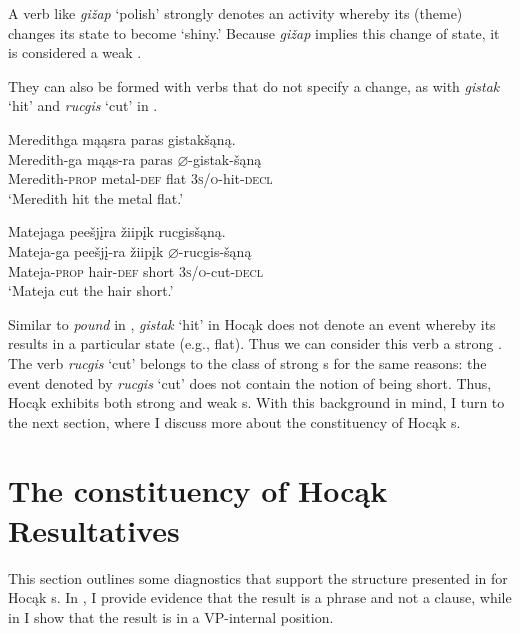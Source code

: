 \documentclass[output=paper]{LSP/langsci}
\begin{document}
A verb like \textit{gižap} `polish' strongly denotes an activity whereby its  (the\-me) changes its state to become `shiny.' Because \textit{gižap} implies this change of state, it is considered a weak . 

They can also be formed with verbs that do not specify a change, as with \textit{gistak} `hit' and \textit{rucgis} `cut' in .

\begin{exe}
\ex\label{ex:rosen:13}
\begin{xlist}

\ex \glll Meredithga mąąsra paras gistakšąną. \\
 Meredith-ga mąąs-ra paras {$\varnothing$}-gistak-šąną\\
Meredith-\textsc{prop} metal-\textsc{def} flat \textsc{3s/o}-hit-\textsc{decl}\\
\glt `Meredith hit the metal flat.'

\ex \glll Matejaga peešjįra žiipįk rucgisšąną.\\
Mateja-ga peešjį-ra žiipįk {$\varnothing$}-rucgis-šąną\\
Mateja-\textsc{prop} hair-\textsc{def} short \textsc{3s/o}-cut-\textsc{decl}\\
\glt `Mateja cut the hair short.'

\end{xlist}
\end{exe}
 
Similar to \textit{pound} in , \textit{gistak} `hit' in Hocąk does not denote an event whereby its  results in a particular state (e.g., flat). Thus we can consider this verb a strong . The verb \textit{rucgis} `cut' belongs to the class of strong s for the same reasons: the event denoted by \textit{rucgis} `cut' does not contain the notion of being short. Thus, Hocąk exhibits both strong and weak s. With this background in mind, I turn to the next section, where I discuss more about the constituency of Hocąk s.

\section{The constituency of Hocąk Resultatives}\label{sec:rosen:3}

This section outlines some diagnostics that support the structure presented in  for Hocąk s. In , I provide evidence that the result is a phrase and not a clause, while in  I show that the result is in a VP-internal position.
 
\end{document}
